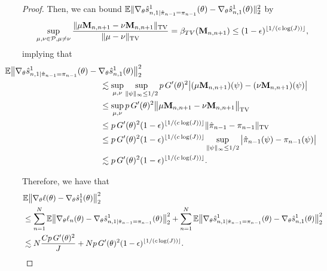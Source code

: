 \begin{proof}
Then, we can bound 
$\mathbb{E}\|\nabla_\theta\hat s_{n,1|\hat\pi_{n-1}=\pi_{n-1}}^1(\theta) - \nabla_\theta\hat s_{n,1}^1(\theta)\|_2^2$ by
\begin{equation}
\sup _{\mu, \nu \in \mathcal{P}, \mu \neq \nu} \frac{\|\mu \textbf{M}_{n,n+1}-\nu \textbf{M}_{n,n+1}\|_{\mathrm{TV}}}{\|\mu-\nu\|_{\mathrm{TV}}} = \beta_{TV}(\textbf{M}_{n,n+1}) \leq (1-\epsilon)^{\lfloor 1/(c\log(J)) \rfloor},
\end{equation}
implying that
\begin{align}
    & \hspace{-10mm}
    \E\big\|\nabla_\theta\hat s_{n,1|\hat\pi_{n-1}=\pi_{n-1}}^1(\theta) - \nabla_\theta\hat s_{n,1}^1(\theta)\big\|_2^2 
    \\ & \hspace{30mm}
    \lesssim \sup_{\mu, \nu} \sup_{\|\psi\|_\infty \leq 1/2} p \, G'(\theta)^2\big|(\mu \textbf{M}_{n,n+1})(\psi)-(\nu \textbf{M}_{n,n+1})(\psi)\big| 
    \\ & \hspace{30mm}
    \leq \sup_{\mu, \nu} p \, G'(\theta)^2\big\|\mu \textbf{M}_{n,n+1}-\nu \textbf{M}_{n,n+1}\big\|_{\mathrm{TV}} 
    \\ & \hspace{30mm}
    \leq p \, G'(\theta)^2(1-\epsilon)^{\floor{1/(c\log(J))}} \|\hat\pi_{n-1} - \pi_{n-1}\|_{\text{TV}} 
    \\ & \hspace{30mm}
    \leq p \, G'(\theta)^2(1-\epsilon)^{\floor{1/(c\log(J))}} \sup_{\|\psi\|_{\infty} \leq 1/2} \big|\hat\pi_{n-1}(\psi) - \pi_{n-1}(\psi)\big| 
    \\ & \hspace{30mm}
    \lesssim p \, G'(\theta)^2(1-\epsilon)^{\floor{1/(c\log(J))}}.
\end{align}

Therefore, we have that
\begin{align}
    &\mathbb{E}\big\|\nabla_\theta\ell(\theta) - \nabla_\theta\hat s_1^1(\theta)\big\|_2^2 \\
    &\leq \sum_{n=1}^N \mathbb{E}\big\|\nabla_\theta\ell_n(\theta) - \nabla_\theta\hat s_{n,1|\hat\pi_{n-1}=\pi_{n-1}}^1(\theta)\big\|_2^2 + \sum_{n=1}^N \mathbb{E}\big\|\nabla_\theta\hat s_{n,1|\hat\pi_{n-1}=\pi_{n-1}}^1(\theta) - \nabla_\theta\hat s_{n,1}^1(\theta)\big\|_2^2\\
    &\lesssim N\frac{Cp \, G'(\theta)^2}{J} + Np \, G'(\theta)^2(1-\epsilon)^{\lfloor 1/(c\log(J)) \rfloor}.
\end{align}
\end{proof}
